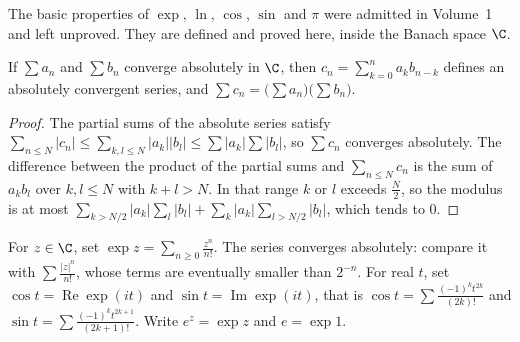 The basic properties of $\exp$, $\ln$, $\cos$, $\sin$ and $\pi$ were admitted in Volume~1 and left unproved. They are defined and proved here, inside the Banach space $\C$.

\begin{lemma}\label{lem:cauchyproduct}
If $\sum a_n$ and $\sum b_n$ converge absolutely in $\C$, then $c_n=\sum_{k=0}^na_kb_{n-k}$ defines an absolutely convergent series, and $\sum c_n=\bigl(\sum a_n\bigr)\bigl(\sum b_n\bigr)$.
\end{lemma}
\begin{proof}
The partial sums of the absolute series satisfy $\sum_{n\le N}|c_n|\le\sum_{k,l\le N}|a_k||b_l|\le\sum|a_k|\sum|b_l|$, so $\sum c_n$ converges absolutely. The difference between the product of the partial sums and $\sum_{n\le N}c_n$ is the sum of $a_kb_l$ over $k,l\le N$ with $k+l>N$. In that range $k$ or $l$ exceeds $\frac N2$, so the modulus is at most $\sum_{k>N/2}|a_k|\sum_l|b_l|+\sum_k|a_k|\sum_{l>N/2}|b_l|$, which tends to $0$.
\end{proof}

\begin{definition}
For $z\in\C$, set $\exp z=\sum_{n\ge0}\frac{z^n}{n!}$. The series converges absolutely: compare it with $\sum\frac{|z|^n}{n!}$, whose terms are eventually smaller than $2^{-n}$. For real $t$, set $\cos t=\operatorname{Re}\exp(it)$ and $\sin t=\operatorname{Im}\exp(it)$, that is $\cos t=\sum\frac{(-1)^kt^{2k}}{(2k)!}$ and $\sin t=\sum\frac{(-1)^kt^{2k+1}}{(2k+1)!}$. Write $e^z=\exp z$ and $e=\exp1$.
\end{definition}

